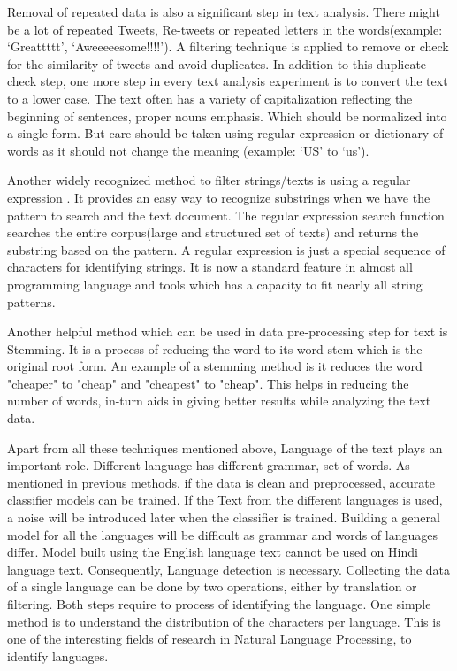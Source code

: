 Removal of repeated data is also a significant step in text analysis. There might be a lot of repeated Tweets, Re-tweets or repeated letters in the words(example: `Greattttt', `Aweeeeesome!!!!'). A filtering technique is applied to remove or check for the similarity of tweets and avoid duplicates. In addition to this duplicate check step, one more step in every text analysis experiment is to convert the text to a lower case. The text often has a variety of capitalization reflecting the beginning of sentences, proper nouns emphasis. Which should be normalized into a single form. But care should be taken using regular expression or dictionary of words as it should not change the meaning (example: `US' to `us').

Another widely recognized method to filter strings/texts is using a regular expression \cite{Thompson}. It provides an easy way to recognize substrings when we have the pattern to search and the text document. The regular expression search function searches the entire corpus(large and structured set of texts) and returns the substring based on the pattern. A regular expression is just a special sequence of characters for identifying strings. It is now a standard feature in almost all programming language and tools which has a capacity to fit nearly all string patterns.   

Another helpful method which can be used in data pre-processing step for text is Stemming. It is a process of reducing the word to its word stem which is the original root form. An example of a stemming method is it reduces the word "cheaper" to "cheap" and "cheapest" to "cheap". This helps in reducing the number of words, in-turn aids in giving better results while analyzing the text data.

Apart from all these techniques mentioned above, Language of the text plays an important role. Different language has different grammar, set of words. As mentioned in previous methods, if the data is clean and preprocessed, accurate classifier models can be trained. If the Text from the different languages is used, a noise will be introduced later when the classifier is trained. Building a general model for all the languages will be difficult as grammar and words of languages differ. Model built using the English language text cannot be used on Hindi language text. Consequently, Language detection is necessary. Collecting the data of a single language can be done by two operations, either by translation or filtering. Both steps require to process of identifying the language. One simple method is to understand the distribution of the characters per language. This is one of the interesting fields of research in Natural Language Processing, to identify languages. 

